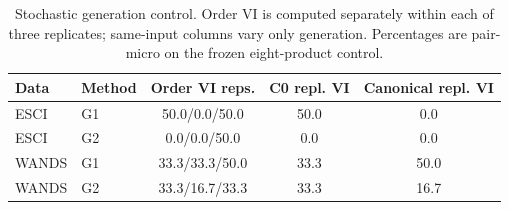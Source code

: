 \begin{table}[t]\caption{Stochastic generation control. Order VI is computed separately within each of three replicates; same-input columns vary only generation. Percentages are pair-micro on the frozen eight-product control.}\label{tab:optnoise}\centering\scriptsize
\begin{tabular}{llccc}\toprule Data&Method&Order VI reps.&C0 repl. VI&Canonical repl. VI\\\midrule
ESCI & G1 & 50.0/0.0/50.0 & 50.0 & 0.0\\
ESCI & G2 & 0.0/0.0/50.0 & 0.0 & 0.0\\
WANDS & G1 & 33.3/33.3/50.0 & 33.3 & 50.0\\
WANDS & G2 & 33.3/16.7/33.3 & 33.3 & 16.7\\
\bottomrule\end{tabular}\end{table}
